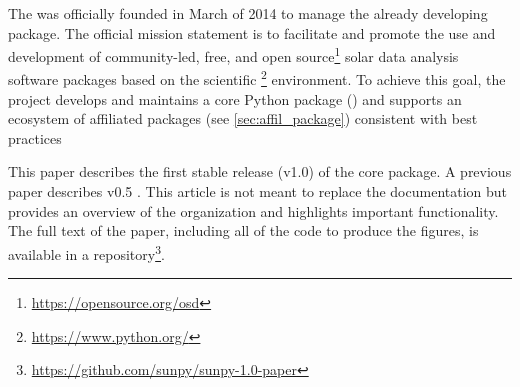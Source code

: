 The \sunpyproj was officially founded in March of 2014 to manage the already developing \sunpypkg package.
The official mission statement is to facilitate and promote the use and development of community-led, free, and open source\footnote{\url{https://opensource.org/osd}} solar data analysis software packages based on the scientific \python\footnote{\url{https://www.python.org/}} environment.
To achieve this goal, the project develops and maintains a core Python package (\sunpypkg) and supports an ecosystem of affiliated packages (see \autoref{sec:affil_package}) consistent with best practices \citep{Wilson:2014cka}

This paper describes the first stable release (v1.0) of the core package.
A previous paper describes v0.5 \citep{Community:2015cy}.
This article is not meant to replace the \sunpypkg documentation but provides an overview of the organization and highlights important functionality.
The full text of the paper, including all of the code to produce the figures, is available in a \github repository\footnote{\url{https://github.com/sunpy/sunpy-1.0-paper}}.
